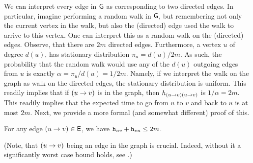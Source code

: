 We can interpret every edge in $\mathsf{G}$ as corresponding to two directed
edges. In particular, imagine performing a random walk in $\mathsf{G}$, but
remembering not only the current vertex in the walk, but also the
(directed) edge used the walk to arrive to this vertex. One can
interpret this as a random walk on the (directed) edges. Observe, that
there are $2m$ directed edges. Furthermore, a vertex $u$ of degree
$d(u)$, has stationary distribution $\pi_u = d(u)/2m$. As such, the
probability that the random walk would use any of the $d(u)$ outgoing
edges from $u$ is exactly $\alpha = \pi_u / d(u) = 1/2m$. Namely, if
we interpret the walk on the graph as walk on the directed edges, the
stationary distribution is uniform. This readily implies that if
$\left({{u} \rightarrow {v}} \right)$ is in the graph, then
$h_{\left({{u} \rightarrow {v}} \right)\left({{u} \rightarrow {v}} \right)}$ is $1/\alpha = 2m$. This readily
implies that the expected time to go from $u$ to $v$ and back to $u$
is at most $2m$. Next, we provide a more formal (and somewhat
different) proof of this.


\begin{lemma}
    For any edge $\left({{u} \rightarrow {v}} \right) \in \mathsf{E}$, we have
    $\mathtt{h}_{uv} + \mathtt{h}_{vu} \leq 2m$.
\end{lemma}

(Note, that $\left({{u} \rightarrow {v}} \right)$ being an edge in the graph is
crucial. Indeed, without it a significantly worst case bound holds,
see .)

